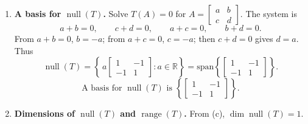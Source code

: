 \documentclass[12pt]{article}
\begin{document}
\begin{enumerate}[label=(\alph*)]
\item \textbf{A basis for $\operatorname{null}(T)$.}
Solve $T(A)=0$ for $A=\begin{bmatrix}a&b\\c&d\end{bmatrix}$. The system is
\[
a+b=0,\qquad c+d=0,\qquad a+c=0,\qquad b+d=0.
\]
From $a+b=0$, $b=-a$; from $a+c=0$, $c=-a$; then $c+d=0$ gives $d=a$. Thus
\[
\operatorname{null}(T)=\left\{\,a\begin{bmatrix}1&-1\\-1&1\end{bmatrix}: a\in\mathbb{R}\right\}
=\mathrm{span}\left\{\begin{bmatrix}1&-1\\-1&1\end{bmatrix}\right\}.
\]
\[
\boxed{\,\text{A basis for }\operatorname{null}(T)\text{ is }\left\{\begin{bmatrix}1&-1\\-1&1\end{bmatrix}\right\}. \,}
\]

\item \textbf{Dimensions of $\operatorname{null}(T)$ and $\operatorname{range}(T)$.}
From (c), $\dim\operatorname{null}(T)=1$.


\end{enumerate}
\end{document}
